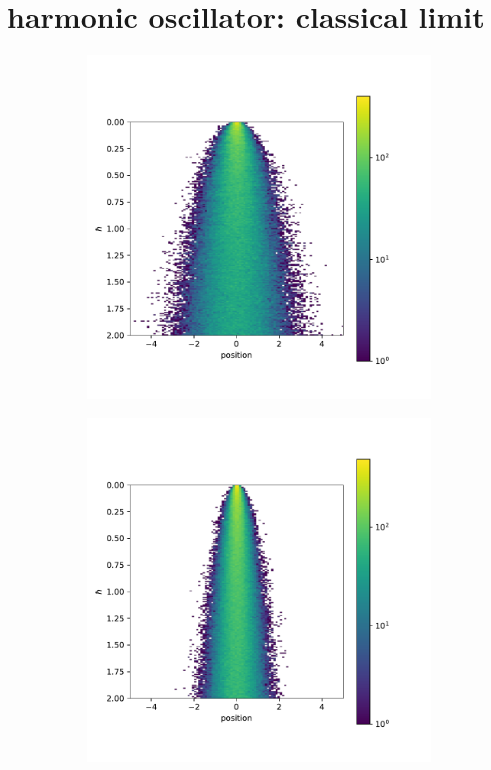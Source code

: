 \documentclass{scrartcl}
\begin{document}
	\section{harmonic oscillator: classical limit}
	\label{sec:harmonic_oscillator_classical_limit_continued}
	\begin{figure}[H]
		\centering
			\begin{subfigure}[c]{0.32\textwidth}
				\includegraphics[width=\textwidth]{../imgs/harmonic_oscillator_classical_limit/harmonic_oscillator_1_classical_limit.pdf}
				\label{fig:harmonic_oscillator_1_classical_limit_continued}
			\end{subfigure}
			\begin{subfigure}[c]{0.32\textwidth}
				\includegraphics[width=\textwidth]{../imgs/harmonic_oscillator_classical_limit/harmonic_oscillator_10_classical_limit.pdf}

\end{subfigure}
\end{figure}
\end{document}
